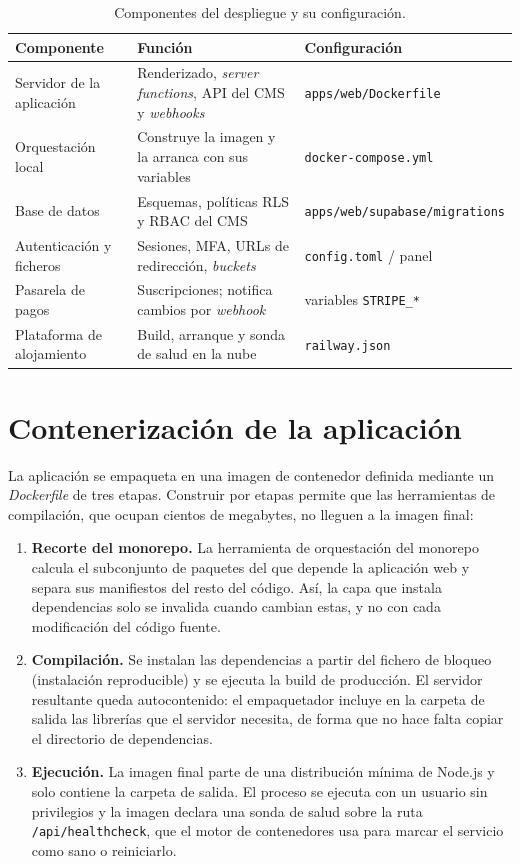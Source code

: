 \begin{table}[htbp]
  \centering
  \small
  \caption{Componentes del despliegue y su configuración.}
  \label{tab:componentes-despliegue}
  \begin{tabularx}{\textwidth}{@{}lXl@{}}
    \toprule
    \textbf{Componente} & \textbf{Función} & \textbf{Configuración} \\
    \midrule
    Servidor de la aplicación & Renderizado, \emph{server functions}, API del CMS y \emph{webhooks} & \texttt{apps/web/Dockerfile} \\
    Orquestación local & Construye la imagen y la arranca con sus variables & \texttt{docker-compose.yml} \\
    Base de datos & Esquemas, políticas RLS y RBAC del CMS & \texttt{apps/web/supabase/migrations} \\
    Autenticación y ficheros & Sesiones, MFA, URLs de redirección, \emph{buckets} & \texttt{config.toml} / panel \\
    Pasarela de pagos & Suscripciones; notifica cambios por \emph{webhook} & variables \texttt{STRIPE\_*} \\
    Plataforma de alojamiento & Build, arranque y sonda de salud en la nube & \texttt{railway.json} \\
    \bottomrule
  \end{tabularx}
\end{table}

\section{Contenerización de la aplicación}
\label{sec:despliegue-imagen}

La aplicación se empaqueta en una imagen de contenedor definida mediante un
\emph{Dockerfile} de tres etapas. Construir por etapas permite que las
herramientas de compilación, que ocupan cientos de megabytes, no lleguen a la
imagen final:

\begin{enumerate}
  \item \textbf{Recorte del monorepo.} La herramienta de orquestación del
    monorepo calcula el subconjunto de paquetes del que depende la aplicación
    web y separa sus manifiestos del resto del código. Así, la capa que
    instala dependencias solo se invalida cuando cambian estas, y no con cada
    modificación del código fuente.
  \item \textbf{Compilación.} Se instalan las dependencias a partir del
    fichero de bloqueo (instalación reproducible) y se ejecuta la build de
    producción. El servidor resultante queda autocontenido: el empaquetador
    incluye en la carpeta de salida las librerías que el servidor necesita,
    de forma que no hace falta copiar el directorio de dependencias.
  \item \textbf{Ejecución.} La imagen final parte de una distribución mínima
    de Node.js y solo contiene la carpeta de salida. El proceso se ejecuta
    con un usuario sin privilegios y la imagen declara una sonda de salud
    sobre la ruta \texttt{/api/healthcheck}, que el motor de contenedores usa
    para marcar el servicio como sano o reiniciarlo.
\end{enumerate}

